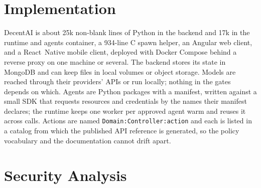 \documentclass[10pt,twocolumn,a4paper]{article}
\newcommand{\sys}{DecentAI}
\newcommand{\code}[1]{\texttt{\small #1}}
\begin{document}
\section{Implementation}
\label{sec:impl}

\sys{} is about 25k non-blank lines of Python in the backend and 17k in
the runtime and agents container, a 934-line C spawn helper, an Angular
web client, and a React~Native mobile client, deployed with Docker
Compose behind a reverse proxy on one machine or several. The backend
stores its state in MongoDB and can keep files in local volumes or
object storage. Models are reached through their providers' APIs or run
locally; nothing in the gates depends on which. Agents are Python
packages with a manifest, written against a small SDK that requests
resources and credentials by the names their manifest declares; the
runtime keeps one worker per approved agent warm and reuses it across
calls. Actions are named \code{Domain:Controller:action} and each is
listed in a catalog from which the published API reference is
generated, so the policy vocabulary and the documentation cannot drift
apart.

\section{Security Analysis}
\label{sec:analysis}
\end{document}
